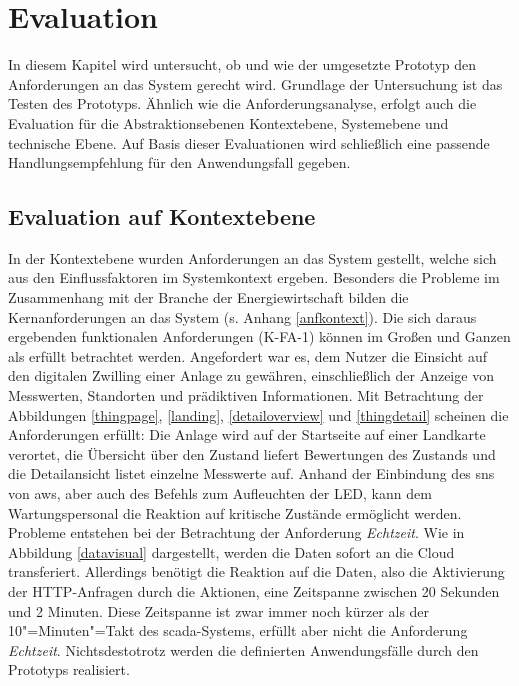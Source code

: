 \section{Evaluation}

In diesem Kapitel wird untersucht, ob und wie der umgesetzte Prototyp den Anforderungen an das System gerecht wird. Grundlage der Untersuchung ist das Testen des Prototyps. Ähnlich wie die Anforderungsanalyse, erfolgt auch die Evaluation für die Abstraktionsebenen Kontextebene, Systemebene und technische Ebene. Auf Basis dieser Evaluationen wird schließlich eine passende Handlungsempfehlung für den Anwendungsfall gegeben. 

\subsection{Evaluation auf Kontextebene}
In der Kontextebene wurden Anforderungen an das System gestellt, welche sich aus den Einflussfaktoren im Systemkontext ergeben. Besonders die Probleme im Zusammenhang mit der Branche der Energiewirtschaft bilden die Kernanforderungen an das System (s. Anhang \ref{anfkontext}). Die sich daraus ergebenden funktionalen Anforderungen (K-FA-1) können im Großen und Ganzen als erfüllt betrachtet werden. Angefordert war es, dem Nutzer die Einsicht auf den digitalen Zwilling einer Anlage zu gewähren, einschließlich der Anzeige von Messwerten, Standorten und prädiktiven Informationen. Mit Betrachtung der Abbildungen \ref{thingpage}, \ref{landing}, \ref{detailoverview} und \ref{thingdetail} scheinen die Anforderungen erfüllt: Die Anlage wird auf der Startseite auf einer Landkarte verortet, die Übersicht über den Zustand liefert Bewertungen des Zustands und die Detailansicht listet einzelne Messwerte auf. Anhand der Einbindung des \ac{sns} von \ac{aws}, aber auch des Befehls zum Aufleuchten der LED, kann dem Wartungspersonal die Reaktion auf kritische Zustände ermöglicht werden. Probleme entstehen bei der Betrachtung der Anforderung \textit{Echtzeit}. Wie in Abbildung \ref{datavisual} dargestellt, werden die Daten sofort an die Cloud transferiert. Allerdings benötigt die Reaktion auf die Daten, also die Aktivierung der HTTP-Anfragen durch die Aktionen, eine Zeitspanne zwischen 20 Sekunden und 2 Minuten. Diese Zeitspanne ist zwar immer noch kürzer als der 10"=Minuten"=Takt des \ac{scada}-Systems, erfüllt aber nicht die Anforderung \textit{Echtzeit}. Nichtsdestotrotz werden die definierten Anwendungsfälle durch den Prototyps realisiert. 

